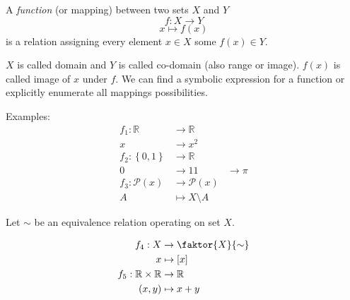 \documentclass[a4paper,landscape,twocolumn]{article}
\newcommand\set[1]{\left\{#1\right\}}
\begin{document}
A \emph{function} (or mapping) between two sets $X$ and $Y$
\[ f: X \rightarrow Y \]
\[ x \mapsto f(x) \]
is a relation assigning every element $x \in X$ some $f(x) \in Y$.

$X$ is called domain and $Y$ is called co-domain (also range or image).
$f(x)$ is called image of $x$ under $f$.
We can find a symbolic expression for a function or explicitly enumerate all mappings possibilities.

Examples:
\begin{align*}
  f_1: \mathbb{R} &\rightarrow \mathbb{R} \\
                x &\rightarrow x^2 \\
  f_2: \set{0,1}  &\rightarrow \mathbb{R} \\
                0 &\rightarrow 1
                1 &\rightarrow \pi \\
  f_3: \mathcal{P}(x) &\rightarrow \mathcal{P}(x) \\
                A &\mapsto X \setminus A
\end{align*}

Let $\sim$ be an equivalence relation operating on set $X$.

\begin{align*}
  f_4: X &\rightarrow \faktor{X}{\sim} \\
       x &\mapsto [x] \\
  f_5: \mathbb{R} \times \mathbb{R} &\rightarrow \mathbb{R} \\
       (x,y) &\mapsto x+y
\end{align*}
\end{document}
